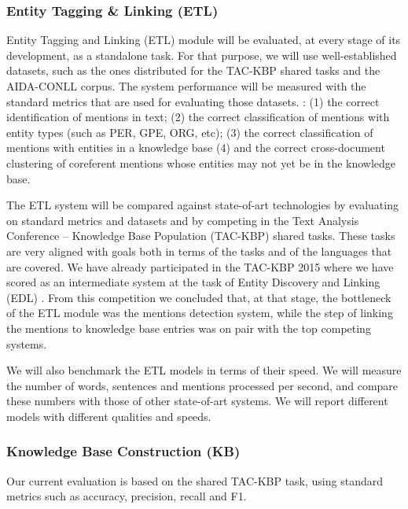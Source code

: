 \subsubsection{Entity Tagging \& Linking (ETL)}

 Entity Tagging and Linking (ETL) module will be evaluated, at every stage of its development, as a standalone task. For that purpose, we will use well-established datasets, such as the ones distributed for the TAC-KBP shared tasks and the AIDA-CONLL corpus. \citep{Hoffart11Robust} The system performance will be measured with the standard metrics that are used for evaluating those datasets. : (1) the correct identification of mentions in text; (2) the correct classification of mentions with entity types (such as PER, GPE, ORG, etc); (3) the correct classification of mentions with entities in a knowledge base (4) and the correct cross-document clustering of coreferent mentions whose entities may not yet be in the knowledge base.

The ETL system will be compared against state-of-art technologies by evaluating on standard metrics and datasets and by competing in the Text Analysis Conference -- Knowledge Base Population (TAC-KBP) shared tasks. These tasks are very aligned with \SUMMA goals both in terms of the tasks and of the languages that are covered. We have already participated in the TAC-KBP 2015 where we have scored as an intermediate system at the task of Entity Discovery and Linking (EDL) \citep{Paikens16SUMMA}. From this competition we concluded that, at that stage, the bottleneck of the ETL module was the mentions detection system, while the step of linking the mentions to knowledge base entries was on pair with the top competing systems.

We will also  benchmark the ETL models in terms of their speed. We will measure the number of words, sentences and mentions processed per second, and compare these numbers with those of other state-of-art systems. We will report  different models with different qualities and speeds.

\subsubsection{Knowledge Base Construction (KB)}

Our current evaluation is based on the shared TAC-KBP task, using standard metrics such as accuracy, precision, recall and F1.


